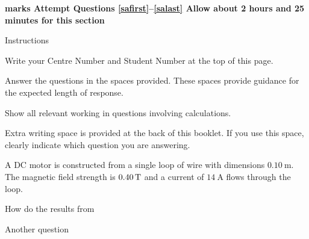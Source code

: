 \documentclass{src/hsc}
\begin{document}
\makebooklettitle

\textbf{%
    {\thissectionpoints} marks \linebreak
    Attempt Questions \ref{safirst}--\ref{salast} \linebreak
    Allow about 2 hours and 25 minutes for this section
}
\vspace{1.2cm}

\begin{infobox}{Instructions}
    \begin{infoitems}[itemsep=2ex]
        \item Write your Centre Number and Student Number at the top of this page.
        \item Answer the questions in the spaces provided. These spaces provide guidance for the expected length of response.
        \item Show all relevant working in questions involving calculations.
        \item Extra writing space is provided at the back of this booklet. \linebreak
        If you use this space, clearly indicate which question you are answering.
    \end{infoitems}
\end{infobox}

\startsectiontwo

\begin{questions}
    \question\label{safirst} A DC motor is constructed from a single loop of wire with dimensions $\SI{0.10}{\m}$. The magnetic field strength is $\SI{0.40}{\mathrm T}$ and a current of $\SI{14}{\A}$ flows through the loop.

    

    \questionbreak

    How do the results from

    \question\label{salast} Another question

\end{questions}

\finishsectiontwo

\writingspace
\writingspace
\end{document}
